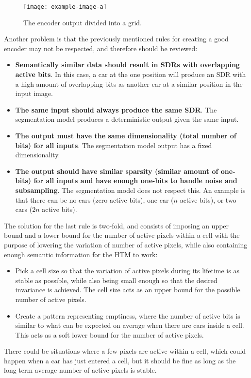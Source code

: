 \begin{figure}[H]
    \centering
    \texttt{[image: example-image-a]}
    \caption{The encoder output divided into a grid.}
    \label{fig:grid}
\end{figure}
Another problem is that the previously mentioned rules for creating a good encoder may not be respected, and therefore should be reviewed:
\begin{itemize}
    \item \textbf{Semantically similar data should result in SDRs with overlapping active bits}. In this case, a car at the one position will produce an SDR with a high amount of overlapping bits as another car at a similar position in the input image.
    \item \textbf{The same input should always produce the same SDR}. The segmentation model produces a deterministic output given the same input.
    \item \textbf{The output must have the same dimensionality (total number of bits) for all inputs}. The segmentation model output has a fixed dimensionality.
    \item \textbf{The output should have similar sparsity (similar amount of one-bits) for all inputs and have enough one-bits to handle noise and subsampling}. The segmentation model does not respect this. An example is that there can be no cars (zero active bits), one car ($n$ active bits), or two cars ($2n$ active bits).
\end{itemize}
The solution for the last rule is two-fold, and  consists of imposing an upper bound and a lower bound for the number of active pixels within a cell with the purpose of lowering the variation of number of active pixels, while also containing enough semantic information for the HTM to work:
\begin{itemize}
    \item Pick a cell size so that the variation of active pixels during its lifetime is as stable as possible, while also being small enough so that the desired invariance is achieved. The cell size acts as an upper bound for the possible number of active pixels.
    \item Create a pattern representing emptiness, where the number of active bits is similar to what can be expected on average when there are cars inside a cell. This acts as a soft lower bound for the number of active pixels.
\end{itemize}
There could be situations where a few pixels are active within a cell, which could happen when a car has just entered a cell, but it should be fine as long as the long term average number of active pixels is stable.
